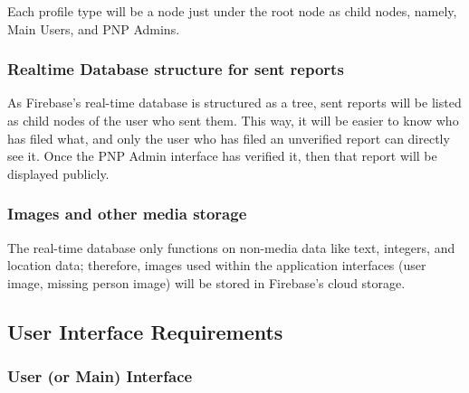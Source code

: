 Each profile type will be a node just under the root node as child nodes, namely, Main Users, and PNP Admins. 

\subsubsection{Realtime Database structure for sent reports}
As Firebase’s real-time database is structured as a tree, sent reports will be listed as child nodes of the user who sent them. This way, it will be easier to know who has filed what, and only the user who has filed an unverified report can directly see it. Once the PNP Admin interface has verified it, then that report will be displayed publicly.

\subsubsection{Images and other media storage}
The real-time database only functions on non-media data like text, integers, and location data; therefore, images used within the application interfaces (user image, missing person image) will be stored in Firebase’s cloud storage. 

\subsection{User Interface Requirements}
\subsubsection{User (or Main) Interface}

